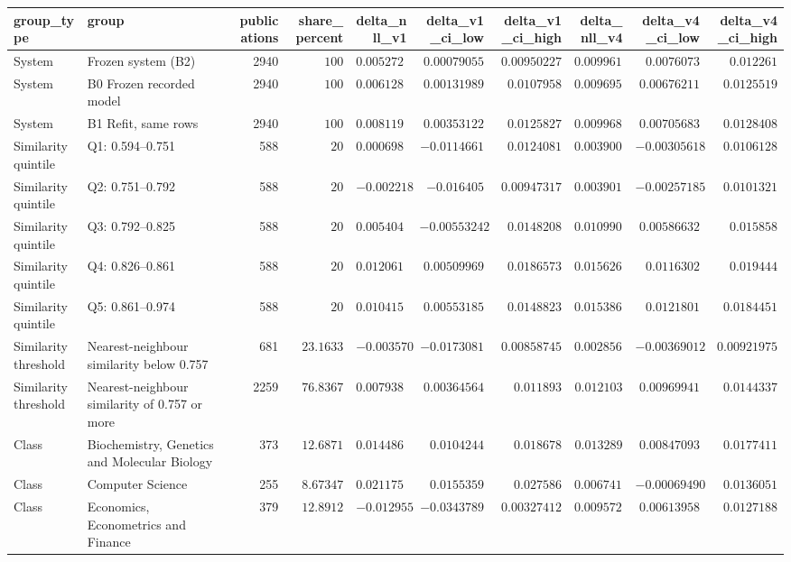 \begin{tabular}{llrrrrrrrr}
\toprule
group\_type & group & publications & share\_percent & delta\_nll\_v1 & delta\_v1\_ci\_low & delta\_v1\_ci\_high & delta\_nll\_v4 & delta\_v4\_ci\_low & delta\_v4\_ci\_high \\
\midrule
System & Frozen system (B2) & 2940 & $100$ & $0.00527229$ & $0.00079055$ & $0.00950227$ & $0.0099611$ & $0.0076073$ & $0.012261$ \\
System & B0 Frozen recorded model & 2940 & $100$ & $0.00612842$ & $0.00131989$ & $0.0107958$ & $0.00969545$ & $0.00676211$ & $0.0125519$ \\
System & B1 Refit, same rows & 2940 & $100$ & $0.00811987$ & $0.00353122$ & $0.0125827$ & $0.00996815$ & $0.00705683$ & $0.0128408$ \\
Similarity quintile & Q1: 0.594–0.751 & 588 & $20$ & $0.000698674$ & $-0.0114661$ & $0.0124081$ & $0.00390085$ & $-0.00305618$ & $0.0106128$ \\
Similarity quintile & Q2: 0.751–0.792 & 588 & $20$ & $-0.00221868$ & $-0.016405$ & $0.00947317$ & $0.00390108$ & $-0.00257185$ & $0.0101321$ \\
Similarity quintile & Q3: 0.792–0.825 & 588 & $20$ & $0.00540459$ & $-0.00553242$ & $0.0148208$ & $0.0109906$ & $0.00586632$ & $0.015858$ \\
Similarity quintile & Q4: 0.826–0.861 & 588 & $20$ & $0.0120614$ & $0.00509969$ & $0.0186573$ & $0.0156262$ & $0.0116302$ & $0.019444$ \\
Similarity quintile & Q5: 0.861–0.974 & 588 & $20$ & $0.0104154$ & $0.00553185$ & $0.0148823$ & $0.0153867$ & $0.0121801$ & $0.0184451$ \\
Similarity threshold & Nearest-neighbour similarity below 0.757 & 681 & $23.1633$ & $-0.00357053$ & $-0.0173081$ & $0.00858745$ & $0.00285613$ & $-0.00369012$ & $0.00921975$ \\
Similarity threshold & Nearest-neighbour similarity of 0.757 or more & 2259 & $76.8367$ & $0.00793805$ & $0.00364564$ & $0.011893$ & $0.012103$ & $0.00969941$ & $0.0144337$ \\
Class & Biochemistry, Genetics and Molecular Biology & 373 & $12.6871$ & $0.0144868$ & $0.0104244$ & $0.018678$ & $0.013289$ & $0.00847093$ & $0.0177411$ \\
Class & Computer Science & 255 & $8.67347$ & $0.0211756$ & $0.0155359$ & $0.027586$ & $0.00674172$ & $-0.000694907$ & $0.0136051$ \\
Class & Economics, Econometrics and Finance & 379 & $12.8912$ & $-0.0129557$ & $-0.0343789$ & $0.00327412$ & $0.00957203$ & $0.00613958$ & $0.0127188$ \\

\end{tabular}
